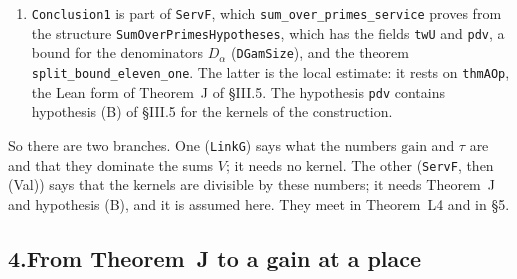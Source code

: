 \documentclass[11pt,letterpaper]{article}
\begin{document}
\begin{enumerate}[label=\textup{(\alph*)},leftmargin=2.4em,itemsep=1pt,topsep=2pt]
Here $D_\alpha$ is an integer denominator of the member, $v_{p_w}$ is the $p_w$-adic valuation, and
\texttt{sp} is a real parameter of the Lean statement. On the route \texttt{sp} is $1$: the statement
\texttt{Serv} contains \texttt{Conclusion1} with this value. The term with $D_\alpha$ does not reach
\eqref{lt:V}. The theorem \texttt{period\_geTU}, which passes from the chain to the period, lowers the
exponent by exactly $v_{p_w}(D_\alpha)$ (\texttt{vDG}), and the two cancel. This is the statement about
kernels.
\item \texttt{Conclusion1} is part of \texttt{ServF}, which \texttt{sum\_over\_primes\_service} proves
from the structure \texttt{SumOverPrimesHypotheses}, which has the fields \texttt{twU} and \texttt{pdv},
a bound for the denominators $D_\alpha$
(\texttt{DGamSize}), and the theorem \texttt{split\_bound\_eleven\_one}. The latter is the local
estimate: it rests on \texttt{thmAOp}, the Lean form of Theorem~J of \S III.5. The hypothesis \texttt{pdv}
contains hypothesis (B) of \S III.5 for the kernels of the construction.
\end{enumerate}
So there are two branches. One (\texttt{LinkG}) says what the numbers $\mathrm{gain}$ and $\tau$ are and
that they dominate the sums $V$; it needs no kernel. The other (\texttt{ServF}, then \textup{(Val)}) says
that the kernels are divisible by these numbers; it needs Theorem~J and hypothesis (B), and it is assumed
here. They meet in Theorem~L4 and in \S5.

\subsection*{4.\quad From Theorem~J to a gain at a place}
\end{document}
